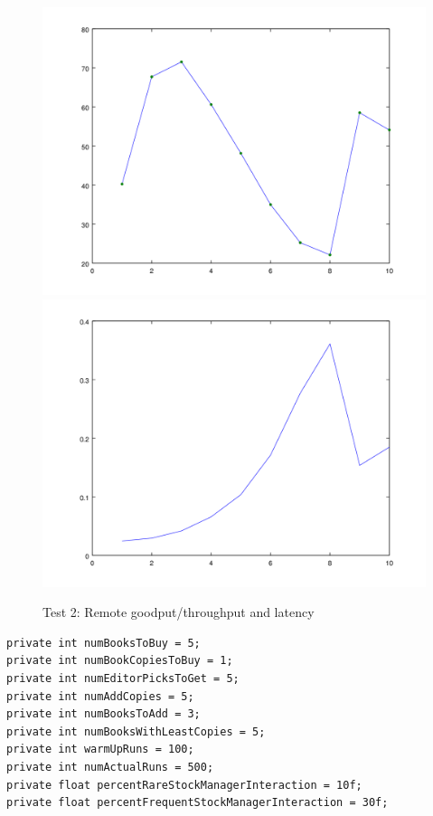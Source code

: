 \documentclass{article}      %
\begin{document}
\begin{figure}[ht]
\centering
 \includegraphics[scale=.33]{graphs/graph4-goodput}
 \includegraphics[scale=.33]{graphs/graph4-latency}
\caption{Test 2: Remote goodput/throughput and latency \label{overflow}}
\end{figure}

\begin{verbatim}
private int numBooksToBuy = 5;
private int numBookCopiesToBuy = 1;
private int numEditorPicksToGet = 5;
private int numAddCopies = 5;
private int numBooksToAdd = 3;
private int numBooksWithLeastCopies = 5;
private int warmUpRuns = 100;
private int numActualRuns = 500;
private float percentRareStockManagerInteraction = 10f;
private float percentFrequentStockManagerInteraction = 30f;
\end{verbatim}
\end{document}
